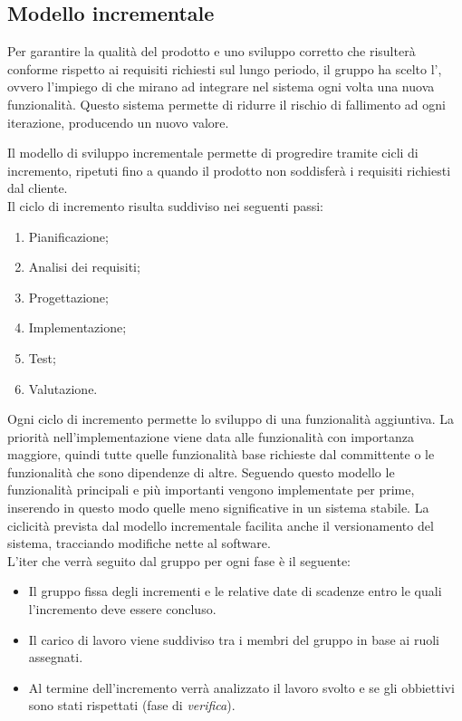 \documentclass[../piano_di_progetto.tex]{subfiles}
\begin{document}
\subsection{Modello incrementale}
\label{sub:incr}

Per garantire la qualità del prodotto e uno sviluppo corretto che risulterà conforme rispetto ai requisiti richiesti sul lungo periodo, il gruppo ha scelto l’, ovvero l’impiego di  che mirano ad integrare nel sistema ogni volta una nuova funzionalità. Questo sistema permette di ridurre il rischio di fallimento ad ogni iterazione, producendo un nuovo valore.

Il modello di sviluppo incrementale permette di progredire tramite cicli di incremento, 
ripetuti fino a quando il prodotto non soddisferà i requisiti richiesti dal cliente. \\
Il ciclo di incremento risulta suddiviso nei seguenti passi:
\begin{enumerate}
    \item Pianificazione;
    \item Analisi dei requisiti;
    \item Progettazione;
    \item Implementazione;
    \item Test;
    \item Valutazione.
\end{enumerate}
Ogni ciclo di incremento permette lo sviluppo di una funzionalità aggiuntiva.
La priorità nell'implementazione viene data alle funzionalità con importanza maggiore, quindi tutte quelle funzionalità base richieste dal committente o le funzionalità che sono dipendenze di altre. 
Seguendo questo modello le funzionalità principali e più importanti vengono implementate per prime, inserendo in questo modo quelle meno significative in un sistema stabile. 
La ciclicità prevista dal modello incrementale facilita anche il versionamento del sistema,
tracciando modifiche nette al software.\\
L'iter che verrà seguito dal gruppo per ogni fase è il seguente:
\begin{itemize}
    \item Il gruppo fissa degli incrementi e le relative date di scadenze entro le quali l'incremento deve essere concluso.
    \item Il carico di lavoro viene suddiviso tra i membri del gruppo in base ai ruoli assegnati.
    \item Al termine dell'incremento verrà analizzato il lavoro svolto e se gli obbiettivi sono stati rispettati (fase di \emph{verifica}).
\end{itemize}
\end{document}
